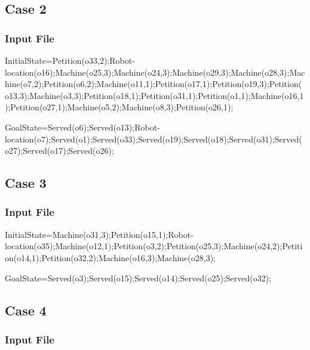 \documentclass[12pt,a4paper,oneside]{article}
\numberwithin{equation}{section}
\numberwithin{equation}{section}
\theoremstyle{definition}
\begin{document}
\begin{itemize}
 


\subsection*{Case 2}

\subsubsection*{Input File}

\begin{listing}[style=consola, numbers=none]
InitialState=Petition(o33,2);Robot-location(o16);Machine(o25,3);Machine(o24,3);Machine(o29,3);Machine(o28,3);Machine(o7,2);Petition(o6,2);Machine(o11,1);Petition(o17,1);Petition(o19,3);Petition(o13,3);Machine(o3,3);Petition(o18,1);Petition(o31,1);Petition(o1,1);Machine(o16,1);Petition(o27,1);Machine(o5,2);Machine(o8,3);Petition(o26,1);

GoalState=Served(o6);Served(o13);Robot-location(o7);Served(o1);Served(o33);Served(o19);Served(o18);Served(o31);Served(o27);Served(o17);Served(o26);
\end{listing}

 


\subsection*{Case 3}

\subsubsection*{Input File}

\begin{listing}[style=consola, numbers=none]
InitialState=Machine(o31,3);Petition(o15,1);Robot-location(o35);Machine(o12,1);Petition(o3,2);Petition(o25,3);Machine(o24,2);Petition(o14,1);Petition(o32,2);Machine(o16,3);Machine(o28,3);

GoalState=Served(o3);Served(o15);Served(o14);Served(o25);Served(o32);
\end{listing}

 


\subsection*{Case 4}

\subsubsection*{Input File}


\end{itemize}
\end{document}
